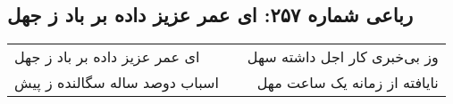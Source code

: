 \begin{center}
\section*{رباعی شماره ۲۵۷: ای عمر عزیز داده بر باد ز جهل}
\label{sec:sh257}
\begin{longtable}{l p{0.5cm} r}
ای عمر عزیز داده بر باد ز جهل
&&
وز بی‌خبری کار اجل داشته سهل
\\
اسباب دوصد ساله سگالنده ز پیش
&&
نایافته از زمانه یک ساعت مهل
\\
\end{longtable}
\end{center}
